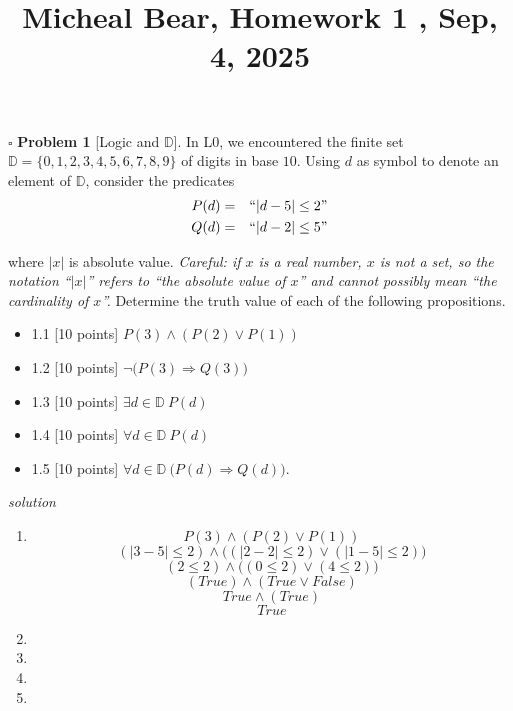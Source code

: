 \documentclass[11pt,twoside]{amsart}
\title {Micheal Bear, Homework 1 , Sep, 4, 2025}
\begin{document}
	\maketitle	

 \noindent $\square$ \textbf{Problem 1}  [\textsf{Logic and $\mathbb{D}$}]. In \textsf{L0}, we encountered the finite set $\mathbb{D} = \{0,1,2,3,4,5,6,7,8,9\}$ of digits in base $10$.  Using $d$ as symbol to denote an element of $\mathbb{D}$, consider the predicates \begin{eqnarray} P(d) &=& \textnormal{``$|d-5| \leq 2$''} \nonumber \\ Q(d) &=& \textnormal{``$|d-2| \leq 5$''}  \nonumber \end{eqnarray}


\noindent where $|x|$ is absolute value.  \textit{Careful: if $x$ is a real number, $x$ is not a set, so the notation ``$|x|$'' refers to ``the absolute value of $x$'' and cannot possibly mean ``the cardinality of $x$''.} Determine the truth value of each of the following propositions.
  \begin{itemize}
  \itemsep0em 
   \item 1.1 [10 points] $P(3) \land (P(2) \lor P(1))$ 
   \item 1.2 [10 points] $\neg \big (P(3) \Rightarrow Q(3) \big )$
   \item 1.3 [10 points] $\exists d \in \mathbb{D} \ P(d)$ 
   \item 1.4 [10 points] $\forall d \in \mathbb{D} \ P(d)$
   \item 1.5 [10 points]  $\forall d \in \mathbb{D} \ \big ( P(d) \Rightarrow Q(d) \big )$.
\end{itemize}



\emph{solution}

\begin{enumerate}[1)]
	\item  
		$$P(3) \land (P(2) \lor P(1))$$
		$$(|3-5| \leq 2) \land \Big((|2-2| \leq 2) \lor (|1-5| \leq 2) \Big) $$
		$$(2 \leq 2) \land \Big( ( 0 \leq 2) \lor (4 \leq 2) \Big)$$
		$$(True) \land ( True \lor False) $$
		$$True \land (True)  $$
		$$True$$
	\item
	\item
	\item 
	\item           
\end{enumerate}
 
\end{document}

